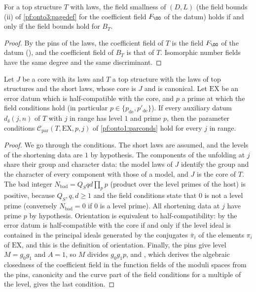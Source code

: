 \begin{lemma}\label{pf:onto3:fieldsmall}
For a top structure $T$ with laws, the field smallness of $(D,L)$ (the field bounds (ii) of \cref{pf:onto3:pagedef} for
the coefficient field $F_{\OO}$ of the datum) holds if and only if the field bounds hold for $B_T$.
\end{lemma}

\begin{proof}
By the pins of the laws, the coefficient field of $T$ is the field $F_{\OO}$ of the datum
(), and the coefficient field of $B_T$ is that of $T$. Isomorphic number
fields have the same degree and the same discriminant.
\end{proof}

\begin{lemma}\label{pf:onto3:parok}
Let $J$ be a core with its laws and $T$ a top structure with the laws of top structures and the short laws, whose core is
$J$ and is canonical. Let $\mathrm{EX}$ be an error datum which is half-compatible with the core, and $p$ a prime at which
the field conditions hold (in particular $p\in\{p_{\mathrm{de}},p'_{\mathrm{de}}\}$). If every auxiliary datum
$d_\delta(j,n)$ of $T$ with $j$ in range has level $1$ and prime $p$, then the parameter conditions
$\mathcal C_{\mathrm{par}}(T,\mathrm{EX},p,j)$ of \cref{pf:onto1:parconds} hold for every $j$ in range.
\end{lemma}

\begin{proof}
We go through the conditions. The short laws are assumed, and the levels of the shortening data are $1$ by
hypothesis. The components of the unfolding at $j$ share their group and character data: the model laws of $J$ identify
the group and the character of every component with those of a model, and $J$ is the core of $T$. The bad integer
$N_{\mathrm{bad}}=Q_Sqd\prod_pp$ (product over the level primes of the host) is positive, because $Q_S,q,d\ge1$ and the
field conditions state that $0$ is not a level prime (conversely $N_{\mathrm{bad}}=0$ if $0$ is a level prime). All
shortening data at $j$ have prime $p$ by hypothesis. Orientation is equivalent to half-compatibility: by
 the error datum is half-compatible with the core if and only
if the level ideal is contained in the principal ideals generated by the conjugates $\bar\pi_i$ of the elements $\pi_i$
of $\mathrm{EX}$, and this is the definition of orientation. Finally, the pins give level $M=g_0g_1$ and $A=1$, so $M$
divides $g_0g_1p$, and , which derives the algebraic
closedness of the coefficient field in the function fields of the moduli spaces from the pins, canonicity and the curve
part of the field conditions for a multiple of the level, gives the last condition.
\end{proof}

